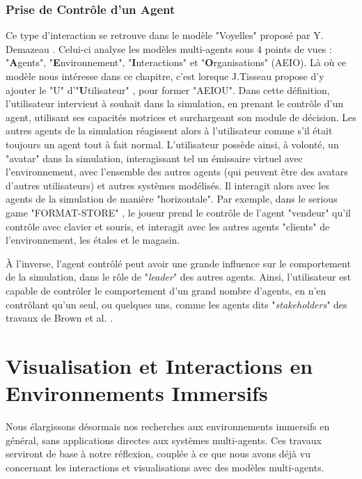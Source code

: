 	\subsubsection{Prise de Contrôle d'un Agent}
		Ce type d'interaction se retrouve dans le modèle "Voyelles" proposé par Y. Demazeau \cite{demazeau_interactions_1995}. Celui-ci analyse les modèles multi-agents sous 4 points de vues : "\textbf{A}gents", "\textbf{E}nvironnement", "\textbf{I}nteractions" et "\textbf{O}rganisations" (AEIO). Là où ce modèle nous intéresse dans ce chapitre, c'est lorsque J.Tisseau propose d'y ajouter le "U" d'"\textbf{U}tilisateur" \cite{tisseau_realite_2001}, pour former "AEIOU". Dans cette définition, l'utilisateur intervient à souhait dans la simulation, en prenant le contrôle d'un agent, utilisant ses capacités motrices et surchargeant son module de décision. Les autres agents de la simulation réagissent alors à l'utilisateur comme s'il était toujours un agent tout à fait normal. 
		L'utilisateur possède ainsi, à volonté, un "avatar" dans la simulation, interagissant tel un émissaire virtuel avec l'environnement, avec l'ensemble des autres agents (qui peuvent être des avatars d'autres utilisateurs) et autres systèmes modélisés. Il interagit alors avec les agents de la simulation de manière "horizontale". Par exemple, dans le serious game "FORMAT-STORE" \cite{mathieu_serious_2011}, le joueur prend le contrôle de l'agent "vendeur" qu'il contrôle avec clavier et souris, et interagit avec les autres agents "clients" de l'environnement, les étales et le magasin.
		
		À l'inverse, l'agent contrôlé peut avoir une grande influence sur le comportement de la simulation, dans le rôle de "\textit{leader}" des autres agents. Ainsi, l'utilisateur est capable de contrôler le comportement d'un grand nombre d'agents, en n'en contrôlant qu'un seul, ou quelques uns, comme les agents dits "\textit{stakeholders}" des travaux de Brown et al. \cite{brown_human-swarm_2014}.
	
	
	\section{Visualisation et Interactions en Environnements Immersifs}	
	
	Nous élargissons désormais nos recherches aux environnements immersifs en général, sans applications directes aux systèmes multi-agents. Ces travaux serviront de base à notre réflexion, couplée à ce que nous avons déjà vu concernant les interactions et visualisations avec des modèles multi-agents.
	
